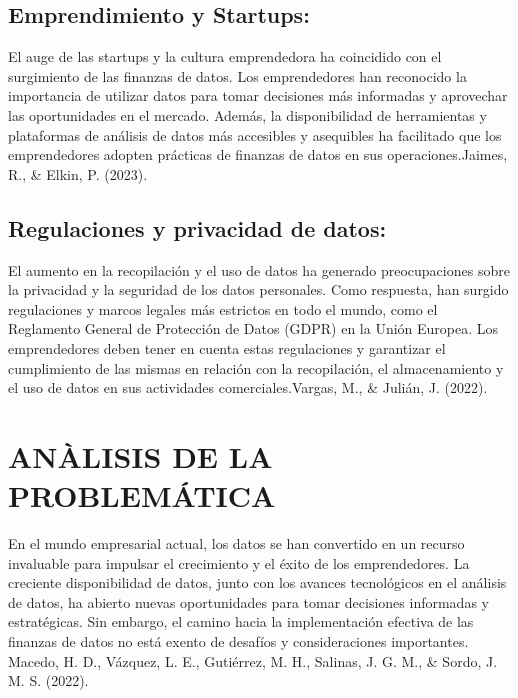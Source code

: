 \documentclass[
  letterpaper,
  DIV=11,
  numbers=noendperiod]{scrreprt}
\begin{document}
\hypertarget{emprendimiento-y-startups}{%
\subsection{Emprendimiento y
Startups:}\label{emprendimiento-y-startups}}

El auge de las startups y la cultura emprendedora ha coincidido con el
surgimiento de las finanzas de datos. Los emprendedores han reconocido
la importancia de utilizar datos para tomar decisiones más informadas y
aprovechar las oportunidades en el mercado. Además, la disponibilidad de
herramientas y plataformas de análisis de datos más accesibles y
asequibles ha facilitado que los emprendedores adopten prácticas de
finanzas de datos en sus operaciones.Jaimes, R., \& Elkin, P. (2023).

\hypertarget{regulaciones-y-privacidad-de-datos}{%
\subsection{Regulaciones y privacidad de
datos:}\label{regulaciones-y-privacidad-de-datos}}

El aumento en la recopilación y el uso de datos ha generado
preocupaciones sobre la privacidad y la seguridad de los datos
personales. Como respuesta, han surgido regulaciones y marcos legales
más estrictos en todo el mundo, como el Reglamento General de Protección
de Datos (GDPR) en la Unión Europea. Los emprendedores deben tener en
cuenta estas regulaciones y garantizar el cumplimiento de las mismas en
relación con la recopilación, el almacenamiento y el uso de datos en sus
actividades comerciales.Vargas, M., \& Julián, J. (2022).

\hypertarget{anuxe0lisis-de-la-problemuxe1tica}{%
\section{ANÀLISIS DE LA
PROBLEMÁTICA}\label{anuxe0lisis-de-la-problemuxe1tica}}

En el mundo empresarial actual, los datos se han convertido en un
recurso invaluable para impulsar el crecimiento y el éxito de los
emprendedores. La creciente disponibilidad de datos, junto con los
avances tecnológicos en el análisis de datos, ha abierto nuevas
oportunidades para tomar decisiones informadas y estratégicas. Sin
embargo, el camino hacia la implementación efectiva de las finanzas de
datos no está exento de desafíos y consideraciones importantes. Macedo,
H. D., Vázquez, L. E., Gutiérrez, M. H., Salinas, J. G. M., \& Sordo, J.
M. S. (2022).
\end{document}
